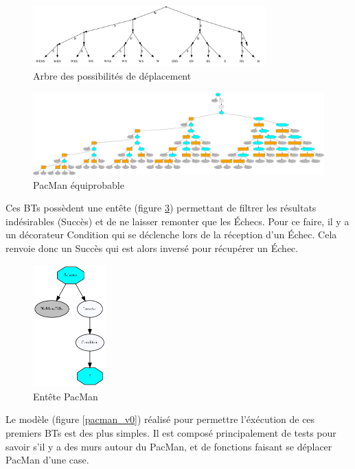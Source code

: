 \documentclass[11pt]{article}
\begin{document}
\begin{figure}[htb]
\centering
\includegraphics[width=0.8\textwidth]{./img/SimplifiedEquiprobable.png}
\caption{\label{schema_equiprobable}Arbre des possibilités de déplacement}
\end{figure}


\begin{figure}[htb]
\centering
\includegraphics[width=.9\linewidth]{./img/PacManEquiprobableBT.png}
\caption{\label{equiprobable}PacMan équiprobable}
\end{figure}

\clearpage

Ces BTs possèdent une entête (figure \ref{entete}) permettant de filtrer les résultats indésirables (Succès) et de ne laisser remonter que les Échecs.
Pour ce faire, il y a un décorateur Condition qui se déclenche lors de la réception d'un Échec.
Cela renvoie donc un Succès qui est alors inversé pour récupérer un Échec. 

\begin{figure}[htb]
\centering
\includegraphics[width=0.25\textwidth]{./img/EnTete.png}
\caption{\label{entete}Entête PacMan}
\end{figure}

Le modèle (figure \ref{pacman_v0}) réalisé pour permettre l'éxécution de ces premiers BTs est des plus simples.
Il est composé principalement de tests pour savoir s'il y a des murs autour du PacMan, et de fonctions faisant se déplacer PacMan d'une case.
\end{document}
